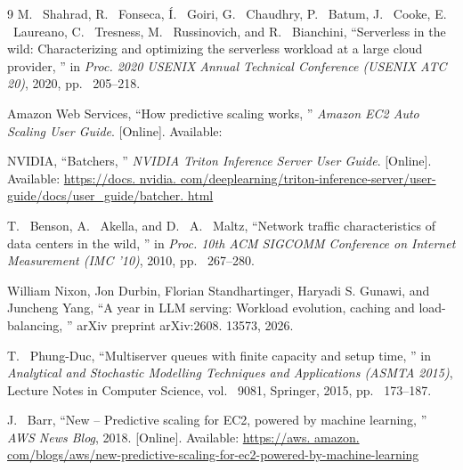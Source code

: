 \documentclass[a4paper, 11pt, dvipdfmx]{jsreport}
\begin{document}
\begin{thebibliography}{9}
M. ~Shahrad, R. ~Fonseca, \'{I}. ~Goiri, G. ~Chaudhry, P. ~Batum, J. ~Cooke, 
E. ~Laureano, C. ~Tresness, M. ~Russinovich, and R. ~Bianchini, ``Serverless in
the wild: Characterizing and optimizing the serverless workload at a large
cloud provider, '' in \textit{Proc.  2020 USENIX Annual Technical Conference
(USENIX ATC 20)}, 2020, pp. ~205--218. 

Amazon Web Services, ``How predictive scaling works, '' \textit{Amazon EC2
Auto Scaling User Guide}.  [Online].  Available: \url{}

NVIDIA, ``Batchers, '' \textit{NVIDIA Triton Inference Server User Guide}. 
[Online].  Available:
\url{https://docs. nvidia. com/deeplearning/triton-inference-server/user-guide/docs/user_guide/batcher. html}

T. ~Benson, A. ~Akella, and D. ~A. ~Maltz, ``Network traffic characteristics of
data centers in the wild, '' in \textit{Proc.  10th ACM SIGCOMM Conference on
Internet Measurement (IMC '10)}, 2010, pp. ~267--280. 

William Nixon, Jon Durbin, Florian Standhartinger, Haryadi S.  Gunawi, and Juncheng Yang, ``A year in {LLM} serving: Workload evolution, caching and load-balancing, '' arXiv preprint arXiv:2608. 13573, 2026. 

T. ~Phung-Duc, ``Multiserver queues with finite capacity and setup time, '' in
\textit{Analytical and Stochastic Modelling Techniques and Applications
(ASMTA 2015)}, Lecture Notes in Computer Science, vol. ~9081, Springer, 2015, 
pp. ~173--187. 

J. ~Barr, ``New -- Predictive scaling for {EC2}, powered by machine learning, ''
\textit{AWS News Blog}, 2018.  [Online].  Available:
\url{https://aws. amazon. com/blogs/aws/new-predictive-scaling-for-ec2-powered-by-machine-learning}

\end{thebibliography}
\end{document}
